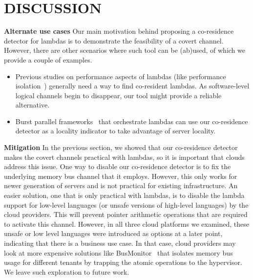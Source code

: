 \section{DISCUSSION}
\label{sec:discussion}
\textbf{Alternate use cases}
Our main motivation behind proposing a co-residence detector for lambdas is
to demonstrate the feasibility of a covert channel. However, there are other
scenarios where such tool can be (ab)used, of which we provide a couple of examples. 
\begin{itemize}
    \item Previous studies on performance aspects of lambdas (like performance 
    isolation~\cite{wangusenix2018}) generally need a way to find co-resident
    lambdas. As software-level logical channels begin to disappear, our tool 
    might provide a reliable alternative.
    \item Burst parallel frameworks~\cite{234886} that orchestrate lambdas can
    use our co-residence detector as a locality indicator to take advantage of
    server locality.
\end{itemize}

\textbf{Mitigation}
In the previous section, we showed that our co-residence detector makes the covert
channels practical with lambdas, so it is important that clouds address this
issue. One way to disable our co-residence detector is to fix the underlying
memory bus channel that it employs. However, this only works for newer
generation of servers and is not practical for existing infrastructure. An
easier solution, one that is only practical with lambdas, is to disable the
lambda support for low-level languages (or unsafe versions of high-level
languages) by the cloud providers. This will prevent pointer arithmetic operations that are
required to activate this channel. However, in all three cloud platforms we examined, 
these unsafe or low level languages were introduced as options at a later point, 
indicating that there is a business use case. In that case, cloud providers may look at
more expensive solutions like BusMonitor~\cite{MemoryBusMitigation} that isolates
memory bus usage for different tenants by trapping the atomic operations to the 
hypervisor. We leave such exploration to future work.

